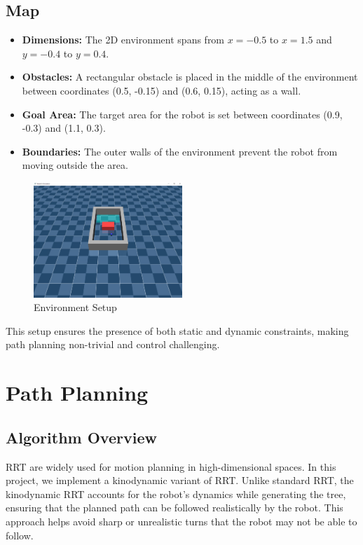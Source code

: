 \documentclass[12pt]{article}
\begin{document}
\subsection{Map}
\begin{itemize}
    \item \textbf{Dimensions:} The 2D environment spans from \(x = -0.5\) to \(x = 1.5\) and \(y = -0.4\) to \(y = 0.4\).
    \item \textbf{Obstacles:} A rectangular obstacle is placed in the middle of the environment between coordinates (0.5, -0.15) and (0.6, 0.15), acting as a wall.
    \item \textbf{Goal Area:} The target area for the robot is set between coordinates (0.9, -0.3) and (1.1, 0.3).
    \item \textbf{Boundaries:} The outer walls of the environment prevent the robot from moving outside the area.
\end{itemize}

\begin{figure}[h]
    \centering
    \includegraphics[width=0.5\textwidth]{./images/render.png}
    \caption{Environment Setup}
    \label{fig:environment}
\end{figure}

This setup ensures the presence of both static and dynamic constraints, making path planning non-trivial and control challenging.

\section{Path Planning}

\subsection{Algorithm Overview}
RRT\cite{planning_dynamics} are widely used for motion planning in high-dimensional spaces. In this project, we implement a kinodynamic variant of RRT. Unlike standard RRT, the kinodynamic RRT accounts for the robot’s dynamics while generating the tree, ensuring that the planned path can be followed realistically by the robot. This approach helps avoid sharp or unrealistic turns that the robot may not be able to follow.
\end{document}
